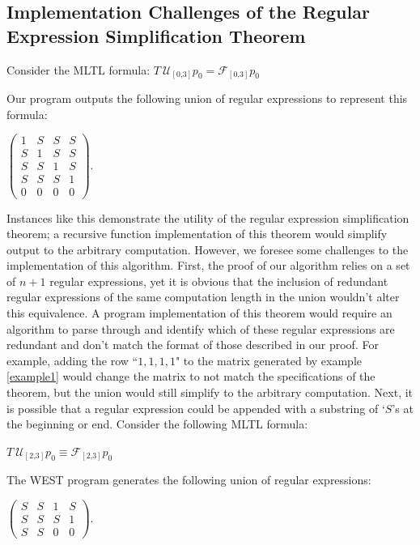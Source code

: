 \documentclass[runningheads]{llncs}
\begin{document}
\subsection{Implementation Challenges of the Regular Expression Simplification Theorem}
\begin{example} \label{example1}
Consider the MLTL formula:
$T \ \mathcal{U_{[\text{0,3}]}} p_0 = \mathcal{F_{[\text{0,3}]}}p_0$
\end{example}
Our program outputs the following union of regular expressions to represent this formula:
\begin{center}
    $
    \begin{pmatrix}
    1 & S & S & S\\
    S & 1 & S & S\\
    S & S & 1 & S\\
    S & S & S & 1\\
    0 & 0 & 0 & 0
    \end{pmatrix}.
$
\end{center}
Instances like this demonstrate the utility of the regular expression simplification theorem; a recursive function implementation of this theorem would simplify output to the arbitrary computation. However, we foresee some challenges to the implementation of this algorithm. 
First, the proof of our algorithm relies on a set of $n+1$ regular expressions, yet it is obvious that the inclusion of redundant regular expressions of the same computation length in the union wouldn't alter this equivalence. A program implementation of this theorem would require an algorithm to parse through and identify which of these regular expressions are redundant and don't match the format of those described in our proof. For example, adding the row ``$1,1,1,1$" to the matrix generated by example \ref{example1} would change the matrix to not match the specifications of the theorem, but the union would still simplify to the arbitrary computation.
Next, it is possible that a regular expression could be appended with a substring of `$S$'s at the beginning or end. Consider the following MLTL formula:
\begin{example} \label{example2}
$T \ \mathcal{U_{[\text{2,3}]}} p_0 \equiv \mathcal{F_{[\text{2,3}]}}p_0$
\end{example}
\noindent The WEST program generates the following union of regular expressions:
\begin{center}
$
    \begin{pmatrix}
    S & S & 1 & S\\
    S & S & S & 1\\
    S & S & 0 & 0
    \end{pmatrix}.
$
\end{center}
\end{document}
